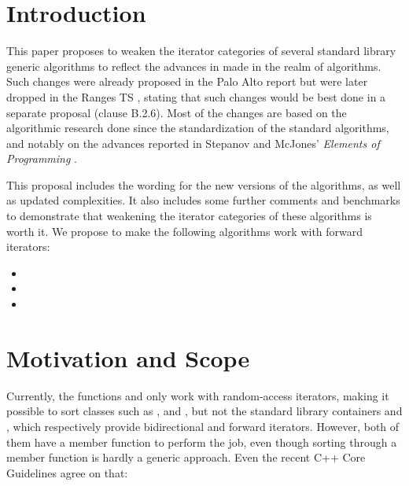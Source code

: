 \documentclass{isocpp_proposal}
\date{\today}
\begin{document}
\maketitle

\section{Introduction}

This paper proposes to weaken the iterator categories of several standard library generic algorithms to reflect the advances in made in the realm of algorithms. Such changes were already proposed in the Palo Alto report \cite{N3351} but were later dropped in the Ranges TS \cite{N4560}, stating that such changes would be best done in a separate proposal (clause B.2.6). Most of the changes are based on the algorithmic research done since the standardization of the standard algorithms, and notably on the advances reported in Stepanov and McJones' \emph{Elements of Programming} \cite{EOP}.

\vspace{0.3cm}

This proposal includes the wording for the new versions of the algorithms, as well as updated complexities. It also includes some further comments and benchmarks to demonstrate that weakening the iterator categories of these algorithms is worth it. We propose to make the following algorithms work with forward iterators:

\begin{itemize}
\item {}
\item {}
\item {}
\end{itemize}

\section{Motivation and Scope}

Currently, the functions  and  only work with random-access iterators, making it possible to sort classes such as \linebreak {},  and , but not the standard library containers  and , which respectively provide bidirectional and forward iterators. However, both of them have a member function  to perform the job, even though sorting through a member function is hardly a generic approach. Even the recent C++ Core Guidelines \cite{CppCoreGuidelines} agree on that:
\end{document}
